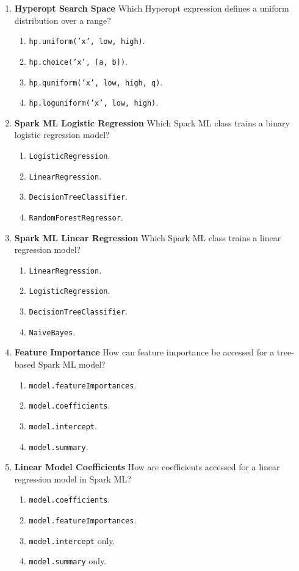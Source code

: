 \documentclass{article}
\begin{document}
\begin{enumerate}[label=\textbf{Q\arabic*.}]
		\item \textbf{Hyperopt Search Space}
		Which Hyperopt expression defines a uniform distribution over a range?
		\begin{enumerate}[label=\Alph*.]
			\item \texttt{hp.uniform('x', low, high)}.
			\item \texttt{hp.choice('x', [a, b])}.
			\item \texttt{hp.quniform('x', low, high, q)}.
			\item \texttt{hp.loguniform('x', low, high)}.
		\end{enumerate}
		
		\item \textbf{Spark ML Logistic Regression}
		Which Spark ML class trains a binary logistic regression model?
		\begin{enumerate}[label=\Alph*.]
			\item \texttt{LogisticRegression}.
			\item \texttt{LinearRegression}.
			\item \texttt{DecisionTreeClassifier}.
			\item \texttt{RandomForestRegressor}.
		\end{enumerate}
		
		\item \textbf{Spark ML Linear Regression}
		Which Spark ML class trains a linear regression model?
		\begin{enumerate}[label=\Alph*.]
			\item \texttt{LinearRegression}.
			\item \texttt{LogisticRegression}.
			\item \texttt{DecisionTreeClassifier}.
			\item \texttt{NaiveBayes}.
		\end{enumerate}
		
		\item \textbf{Feature Importance}
		How can feature importance be accessed for a tree-based Spark ML model?
		\begin{enumerate}[label=\Alph*.]
			\item \texttt{model.featureImportances}.
			\item \texttt{model.coefficients}.
			\item \texttt{model.intercept}.
			\item \texttt{model.summary}.
		\end{enumerate}
		
		\item \textbf{Linear Model Coefficients}
		How are coefficients accessed for a linear regression model in Spark ML?
		\begin{enumerate}[label=\Alph*.]
			\item \texttt{model.coefficients}.
			\item \texttt{model.featureImportances}.
			\item \texttt{model.intercept} only.
			\item \texttt{model.summary} only.
		\end{enumerate}
		

\end{enumerate}
\end{document}
